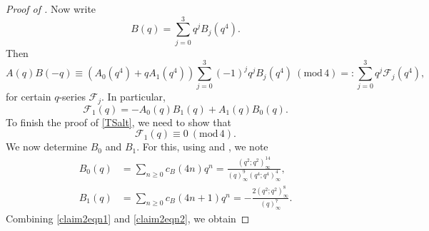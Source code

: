 \documentclass[12pt,reqno]{amsart}
\renewcommand{\b}{\beta}
\renewcommand{\(}{\left\(}
\renewcommand{\)}{\right\)}
\newcommand{\os}[2]{\overset{#1}{#2}}
\numberwithin{equation}{section}
\theoremstyle{plain}
\theoremstyle{definition}
\numberwithin{equation}{section}
\renewcommand{\pmod}[1]{\ \left( \mathrm{mod} \, #1 \right)}
\begin{document}
\begin{proof}[Proof of ]
Now write
\[
B(q)=\sum_{j=0}^{3}q^j\!B_j\!\left(q^4\right).
\]
Then %
\[
A(q)B(-q)\equiv \left(A_0\!\left(q^4\right)+qA_1\!\left(q^4\right)\right)\sum_{j=0}^{3}(-1)^jq^j\!B_j\!\left(q^4\right)\!\pmod{4}=:\sum_{j=0}^3q^j\!\mathcal{F}_j\!\left(q^4\right),
\]
for certain $q$-series $\mathcal{F}_j$. In particular, %
\[
\mathcal{F}_1(q)=-A_0\!\left(q\right)B_1\!\left(q\right)+A_1\!\left(q\right)B_0\!\left(q\right).
\]
To finish the proof of \eqref{TSalt}, we need to show that
\begin{equation}\label{F1}
\mathcal{F}_1(q)\equiv 0\pmod{4}.
\end{equation}
We now determine $B_0$ and $B_1$. For this, using  and , we note %
\begin{align}\label{claim2eqn2}
B_0(q)&=\sum_{n\ge 0}c_B(4n)q^n=\frac{\left(q^{2};q^2\right)^{14}_{\infty}}{\left(q\right)^9_{\infty} \left(q^{4};q^{4}\right)^4_{\infty}},\nonumber\\%
B_1(q)&=\sum_{n\ge 0}c_B(4n+1)q^n=-\frac{2\left(q^2;q^2\right)^8_{\infty}}{\left(q\right)^7_{\infty}}.
\end{align}
 Combining \eqref{claim2eqn1} and \eqref{claim2eqn2}, we obtain 

\end{proof}
\end{document}
